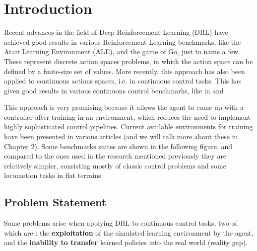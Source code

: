 \chapter{Introduction}
\label{ch:intro}



Recent advances in the field of Deep Reinforcement Learning (DRL) have achieved good
results in various Reinforcement Learning benchmarks, like the Atari Learning Environment (ALE), 
and the game of Go, just to name a few. These represent discrete action spaces problems, in which 
the action space can be defined by a finite-size set of values. More recently, this approach has also 
been applied to continuous actions spaces, i.e. in continuous control tasks. This has given good results 
in various continuous control benchmarks, like in \citeauthor{DeepmindEmergenceLocomotion}  and \citeauthor{DeepMimic}.

\figDrlLocomotionMotivation

This approach is very promising because it allows the agent to come up with a controller after training in
an environment, which reduces the need to implement highly sophisticated control pipelines. Current available 
environments for training have been presented in various articles (and we will talk more about these in Chapter 2).
Some benchmarks suites are shown in the following figure, and compared to the ones used in the research mentioned previously
they are relatively simpler, consisting mostly of classic control problems and some locomotion tasks in flat terrains.

\figDrlBenchmarks

\section{Problem Statement}
\label{sec:problem}

Some problems arise when applying DRL to continuous control tasks, two of which are : the \textbf{exploitation} 
of the simulated learning environment by the agent, and the \textbf{inability to transfer} learned policies into 
the real world (reality gap).

